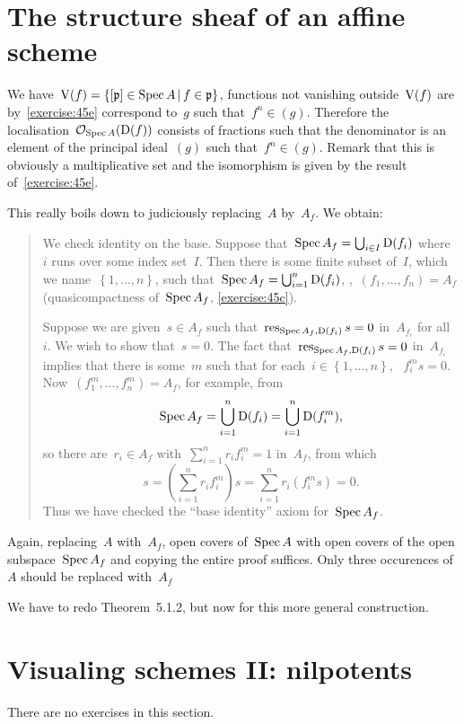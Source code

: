 \section{The structure sheaf of an affine scheme}

\begin{exercise}
  We have~$\operatorname{V}(f)=\left\{ [\mathfrak{p}]\in\operatorname{Spec} A\,|\,f\in\mathfrak{p} \right\}$, functions not vanishing outside~$\operatorname{V}(f)$ are by~\autoref{exercise:45e} correspond to~$g$ such that~$f^n\in(g)$. Therefore the localisation~$\mathcal{O}_{\operatorname{Spec} A}(\operatorname{D}(f))$ consists of fractions such that the denominator is an element of the principal ideal~$(g)$ such that~$f^n\in(g)$. Remark that this is obviously a multiplicative set and the isomorphism is given by the result of~\autoref{exercise:45e}.
\end{exercise}

\begin{exercise}
  This really boils down to judiciously replacing~$A$ by~$A_f$. We obtain:
  \begin{quote}
    We check identity on the base. Suppose that~$\operatorname{Spec} A_f=\bigcup_{i\in I}\operatorname{D}(f_i)$ where~$i$ runs over some index set~$I$. Then there is some finite subset of~$I$, which we name~$\left\{ 1,\ldots,n \right\}$, such that~$\operatorname{Spec} A_f=\bigcup_{i=1}^n\operatorname{D}(f_i)$, \ie,~$(f_1,\ldots,f_n)=A_f$ (quasicompactness of~$\operatorname{Spec} A_f$, \autoref{exercise:45c}).

    Suppose we are given~$s\in A_f$ such that~$\operatorname{res}_{\operatorname{Spec} A_f,\operatorname{D}(f_i)}s=0$ in~$A_{f_i}$ for all~$i$. We wish to show that~$s=0$. The fact that~$\operatorname{res}_{\operatorname{Spec} A_f,\operatorname{D}(f_i)}s=0$ in~$A_{f_i}$ implies that there is some~$m$ such that for each~$i\in\left\{ 1,\ldots,n \right\}$, ~$f_i^ms=0$. Now~$(f_1^m,\ldots,f_n^m)=A_f$, for example, from
    \begin{equation}
      \operatorname{Spec} A_f=\bigcup_{i=1}^n\operatorname{D}(f_i)=\bigcup_{i=1}^n\operatorname{D}(f_i^m),
    \end{equation}
    so there are~$r_i\in A_f$ with~$\sum_{i=1}^nr_if_i^m=1$ in~$A_f$, from which
    \begin{equation}
      s=\left( \sum_{i=1}^nr_if_i^m \right)s=\sum_{i=1}^nr_i(f_i^ms)=0.
    \end{equation}
    Thus we have checked the ``base identity'' axiom for~$\operatorname{Spec} A_f$.
  \end{quote}
\end{exercise}

\begin{exercise}
  \label{exercise:51c}
  Again, replacing~$A$ with~$A_f$, open covers of~$\operatorname{Spec} A$ with open covers of the open subspace~$\operatorname{Spec} A_f$ and copying the entire proof suffices. Only three occurences of~$A$ should be replaced with~$A_f$
\end{exercise}

\begin{exercise}
  \label{exercise:51d}
  We have to redo Theorem~5.1.2, but now for this more general construction.
\end{exercise}


\section{Visualing schemes II: nilpotents}

There are no exercises in this section.
